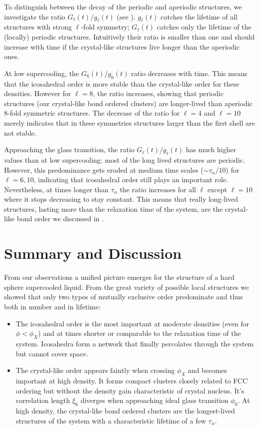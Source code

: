 To distinguish between the decay of the periodic and aperiodic structures, we investigate the ratio $G_\ell(t)/g_\ell(t)$ (see ). $g_\ell(t)$ catches the lifetime of all structures with strong $\ell$-fold symmetry; $G_\ell(t)$ catches only the lifetime of the (locally) periodic structures. Intuitively their ratio is smaller than one and should increase with time if the crystal-like structures live longer than the aperiodic ones.

At low supercooling, the $G_6(t)/g_6(t)$ ratio decreases with time. This means that the icosahedral order is more stable than the crystal-like order for these densities. However for $\ell=8$, the ratio increases, showing that periodic structures (our crystal-like bond ordered clusters) are longer-lived than aperiodic $8$-fold symmetric structures. The decrease of the ratio for $\ell=4$ and $\ell=10$ merely indicates that in these symmetries structures larger than the first shell are not stable.

Approaching the glass transition, the ratio $G_\ell(t)/g_\ell(t)$ has much higher values than at low supercooling: most of the long lived structures are periodic. However, this predominance gets eroded at medium time scales ($\sim\tau_\alpha/10$) for $\ell=6,10$, indicating that icosahedral order still plays an important role. Nevertheless, at times longer than $\tau_\alpha$ the ratio increases for all $\ell$ except $\ell=10$ where it stops decreasing to stay constant. This means that really long-lived structures, lasting more than the relaxation time of the system, are the crystal-like bond order we discussed in . 

\section{Summary and Discussion}

From our observations a unified picture emerges for the structure of a hard sphere supercooled liquid. From the great variety of possible local structures we showed that only two types of mutually exclusive order predominate and thus both in number and in lifetime: 
\begin{itemize}
	\item The icosahedral order is the most important at moderate densities (even for $\phi<\phi_X$) and at times shorter or comparable to the relaxation time of the system. Icosahedra form a network that finally percolates through the system but cannot cover space.
	\item The crystal-like order appears faintly when crossing $\phi_X$ and becomes important at high density. It forms compact clusters closely related to \ac{FCC} ordering but without the density gain characteristic of crystal nucleus. It's correlation length $\xi_6$ diverges when approaching ideal glass transition $\phi_0$. At high density, the crystal-like bond ordered clusters are the longest-lived structures of the system with a characteristic lifetime of a few $\tau_\alpha$.
\end{itemize}

